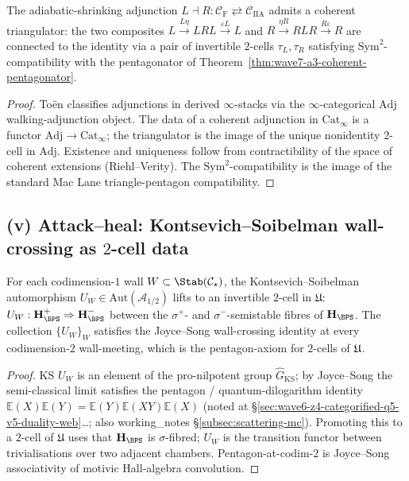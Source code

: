 \begin{theorem}
\label{thm:wave7-a3-triangulator}
\ClaimStatusTheorem
The adiabatic-shrinking adjunction
$L \dashv R : \mathcal{C}_{\mathrm{F}} \rightleftarrows \mathcal{C}_{\mathrm{IIA}}$
admits a coherent triangulator: the two composites
$L \xrightarrow{L\eta} LRL \xrightarrow{\varepsilon L} L$ and
$R \xrightarrow{\eta R} RLR \xrightarrow{R\varepsilon} R$
are connected to the identity via a pair of invertible $2$-cells
$\tau_L, \tau_R$ satisfying $\mathrm{Sym}^2$-compatibility with the
pentagonator of Theorem~\ref{thm:wave7-a3-coherent-pentagonator}.
\end{theorem}

\begin{proof}
Toën \cite{Toen2005} classifies adjunctions in derived $\infty$-stacks
via the $\infty$-categorical $\mathrm{Adj}$ walking-adjunction object.
The data of a coherent adjunction in $\mathrm{Cat}_\infty$ is a
functor $\mathrm{Adj} \to \mathrm{Cat}_\infty$; the triangulator is
the image of the unique nonidentity $2$-cell in $\mathrm{Adj}$.
Existence and uniqueness follow from contractibility of the space
of coherent extensions (Riehl--Verity). The $\mathrm{Sym}^2$-compatibility
is the image of the standard Mac Lane triangle-pentagon compatibility.
\end{proof}

\subsection*{(v) Attack--heal: Kontsevich--Soibelman wall-crossing as
$2$-cell data}

\begin{theorem}
\label{thm:wave7-a3-ks-2-cells}
\ClaimStatusTheorem
For each codimension-$1$ wall $W \subset \Stab(\mathcal{C}_\star)$,
the Kontsevich--Soibelman automorphism
$U_W \in \mathrm{Aut}(\mathcal{A}_{1/2})$
\cite{KontsevichSoibelman2008} lifts to an invertible
$2$-cell in $\mathfrak{U}$:
$U_W : \mathbf{H}_{\BPS}^+ \Rightarrow \mathbf{H}_{\BPS}^-$
between the $\sigma^+$- and $\sigma^-$-semistable fibres of
$\mathbf{H}_{\BPS}$. The collection
$\{U_W\}_W$ satisfies the Joyce--Song wall-crossing identity
\cite{JoyceSong2012} at every codimension-$2$ wall-meeting, which
is the pentagon-axiom for $2$-cells of $\mathfrak{U}$.
\end{theorem}

\begin{proof}
KS $U_W$ is an element of the pro-nilpotent group
$\widehat{G}_{\mathrm{KS}}$; by Joyce--Song the semi-classical
limit satisfies the pentagon / quantum-dilogarithm identity
$\mathbb{E}(X)\mathbb{E}(Y) = \mathbb{E}(Y)\mathbb{E}(XY)\mathbb{E}(X)$
(noted at \S\ref{sec:wave6-z4-categorified-q5-v5-duality-web}\ldots;
also working\_notes \S\ref{subsec:scattering-mc}). Promoting this to
a $2$-cell of $\mathfrak{U}$ uses that $\mathbf{H}_{\BPS}$ is
$\sigma$-fibred; $U_W$ is the transition functor between
trivialisations over two adjacent chambers. Pentagon-at-codim-$2$
is Joyce--Song associativity of motivic Hall-algebra convolution.
\end{proof}

